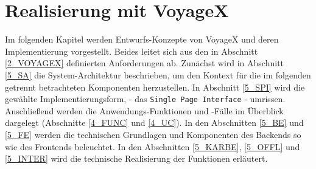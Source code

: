 \newpage

%
%
\section{Realisierung mit VoyageX}
Im folgenden Kapitel werden Entwurfs-Konzepte von VoyageX und deren Implementierung vorgestellt. Beides leitet sich aus den
in Abschnitt \ref{2_VOYAGEX} definierten Anforderungen ab.
Zunächst wird in Abschnitt \ref{5_SA} die System-Architektur beschrieben, um den Kontext für die im folgenden getrennt betrachteten Komponenten herzustellen. In Abschnitt \ref{5_SPI} wird die gewählte Implementierungsform, - das \texttt{Single Page Interface} - umrissen. Anschließend werden die Anwendungs-Funktionen und -Fälle im Überblick dargelegt (Abschnitte \ref{4_FUNC} und \ref{4_UC}). In den Abschnitten \ref{5_BE} und  \ref{5_FE} werden die technischen Grundlagen und Komponenten des Backends so wie des Frontends beleuchtet. In den Abschnitten \ref{5_KARBE}, \ref{5_OFFL} und \ref{5_INTER} wird die technische Realisierung der Funktionen erläutert.

